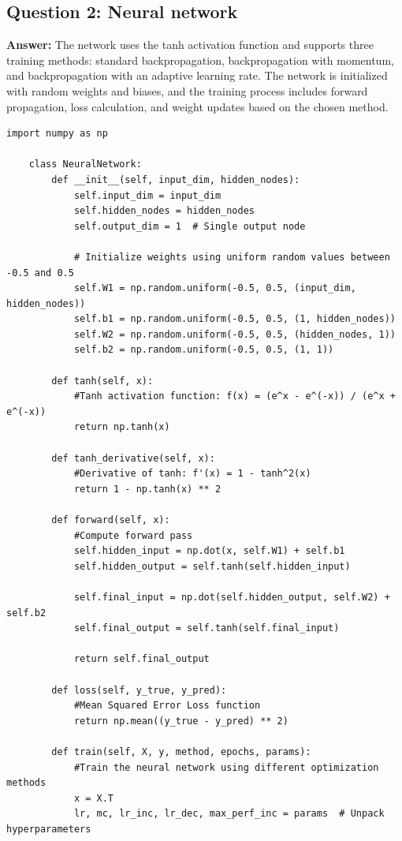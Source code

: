 \documentclass[a4paper,12pt]{article}
\begin{document}
\subsection{Question 2: Neural network }
\textbf{Answer:} The network uses the tanh activation function and supports three training methods: standard backpropagation, backpropagation with momentum, and backpropagation with an adaptive learning rate.
The network is initialized with random weights and biases, and the training process includes forward propagation, loss calculation, and weight updates based on the chosen method.

\begin{lstlisting}[style=python]
    import numpy as np
    
    class NeuralNetwork:
        def __init__(self, input_dim, hidden_nodes):
            self.input_dim = input_dim
            self.hidden_nodes = hidden_nodes
            self.output_dim = 1  # Single output node
    
            # Initialize weights using uniform random values between -0.5 and 0.5
            self.W1 = np.random.uniform(-0.5, 0.5, (input_dim, hidden_nodes))  
            self.b1 = np.random.uniform(-0.5, 0.5, (1, hidden_nodes))  
            self.W2 = np.random.uniform(-0.5, 0.5, (hidden_nodes, 1))  
            self.b2 = np.random.uniform(-0.5, 0.5, (1, 1))  
    
        def tanh(self, x):
            #Tanh activation function: f(x) = (e^x - e^(-x)) / (e^x + e^(-x))
            return np.tanh(x)
    
        def tanh_derivative(self, x):
            #Derivative of tanh: f'(x) = 1 - tanh^2(x)
            return 1 - np.tanh(x) ** 2
    
        def forward(self, x):
            #Compute forward pass
            self.hidden_input = np.dot(x, self.W1) + self.b1
            self.hidden_output = self.tanh(self.hidden_input)
    
            self.final_input = np.dot(self.hidden_output, self.W2) + self.b2
            self.final_output = self.tanh(self.final_input)  
    
            return self.final_output
    
        def loss(self, y_true, y_pred):
            #Mean Squared Error Loss function
            return np.mean((y_true - y_pred) ** 2)
    
        def train(self, X, y, method, epochs, params):
            #Train the neural network using different optimization methods
            x = X.T
            lr, mc, lr_inc, lr_dec, max_perf_inc = params  # Unpack hyperparameters
    

\end{lstlisting}
\end{document}
